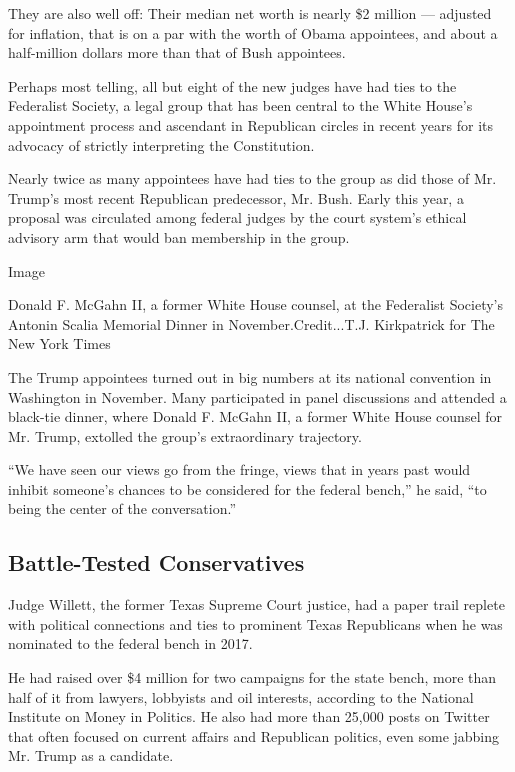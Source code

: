 They are also well off: Their median net worth is nearly \$2 million ---
adjusted for inflation, that is on a par with the worth of Obama
appointees, and about a half-million dollars more than that of Bush
appointees.

Perhaps most telling, all but eight of the new judges have had ties to
the Federalist Society, a legal group that has been central to the White
House's appointment process and ascendant in Republican circles in
recent years for its advocacy of strictly interpreting the Constitution.

Nearly twice as many appointees have had ties to the group as did those
of Mr. Trump's most recent Republican predecessor, Mr. Bush. Early this
year, a proposal was circulated among federal judges by the court
system's ethical advisory arm that would ban membership in the group.

Image

Donald F. McGahn II, a former White House counsel, at the Federalist
Society's Antonin Scalia Memorial Dinner in November.Credit...T.J.
Kirkpatrick for The New York Times

The Trump appointees turned out in big numbers at its national
convention in Washington in November. Many participated in panel
discussions and attended a black-tie dinner, where Donald F. McGahn II,
a former White House counsel for Mr. Trump, extolled the group's
extraordinary trajectory.

``We have seen our views go from the fringe, views that in years past
would inhibit someone's chances to be considered for the federal
bench,'' he said, ``to being the center of the conversation.''

\hypertarget{battle-tested-conservatives}{%
\subsection{Battle-Tested
Conservatives}\label{battle-tested-conservatives}}

Judge Willett, the former Texas Supreme Court justice, had a paper trail
replete with political connections and ties to prominent Texas
Republicans when he was nominated to the federal bench in 2017.

He had raised over \$4 million for two campaigns for the state bench,
more than half of it from lawyers, lobbyists and oil interests,
according to the National Institute on Money in Politics. He also had
more than 25,000 posts on Twitter that often focused on current affairs
and Republican politics, even some jabbing Mr. Trump as a candidate.

